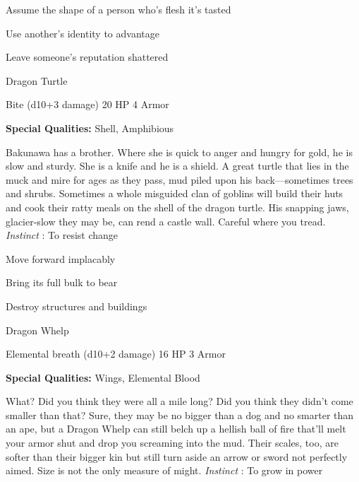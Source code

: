 \startitemize[1,packed]

\item Assume the shape of a person who's flesh it's tasted

 
\item Use another's identity to advantage

 
\item Leave someone's reputation shattered


\stopitemize
 
\startMonsterName
Dragon Turtle	 
\stopMonsterName
 

Bite (d10+3 damage)	20 HP	4 Armor

 


 
\startMonsterQualities
{\bf Special Qualities:}  Shell, Amphibious
\stopMonsterQualities
 
\startMonsterDescription
Bakunawa has a brother. Where she is quick to anger and hungry for gold, he is slow and sturdy. She is a knife and he is a shield. A great turtle that lies in the muck and mire for ages as they pass, mud piled upon his back—sometimes trees and shrubs. Sometimes a whole misguided clan of goblins will build their huts and cook their ratty meals on the shell of the dragon turtle. His snapping jaws, glacier-slow they may be, can rend a castle wall. Careful where you tread. {\em Instinct} : To resist change
\stopMonsterDescription
 
\startitemize[1,packed]

\item Move forward implacably

 
\item Bring its full bulk to bear

 
\item Destroy structures and buildings


\stopitemize
 
\startMonsterName
Dragon Whelp	 
\stopMonsterName
 

Elemental breath (d10+2 damage)	16 HP	3 Armor

 


 
\startMonsterQualities
{\bf Special Qualities:}  Wings, Elemental Blood
\stopMonsterQualities
 
\startMonsterDescription
What? Did you think they were all a mile long? Did you think they didn’t come smaller than that? Sure, they may be no bigger than a dog and no smarter than an ape, but a Dragon Whelp can still belch up a hellish ball of fire that’ll melt your armor shut and drop you screaming into the mud. Their scales, too, are softer than their bigger kin but still turn aside an arrow or sword not perfectly aimed. Size is not the only measure of might. {\em Instinct} : To grow in power
\stopMonsterDescription
 
